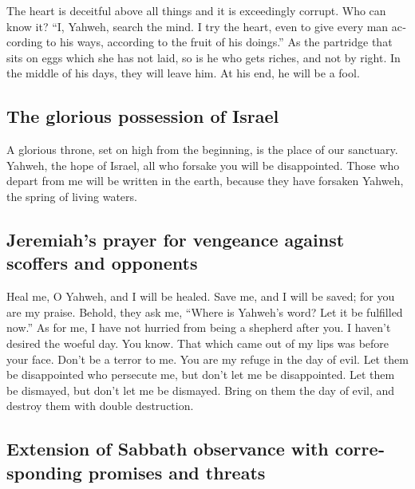 \begin{paracol}{2}
\begin{otherlanguage}{english}
 The heart is deceitful above all things and it is
exceedingly corrupt. Who can know it?  ``I, Yahweh,
search the mind. I try the heart, even to give every man according to
his ways, according to the fruit of his doings.''  As the
partridge that sits on eggs which she has not laid, so is he who gets
riches, and not by right. In the middle of his days, they will leave
him. At his end, he will be a fool.

\hypertarget{the-glorious-possession-of-israel}{%
\subsection{The glorious possession of
Israel}\label{the-glorious-possession-of-israel}}

 A glorious throne, set on high from the beginning, is
the place of our sanctuary.  Yahweh, the hope of Israel,
all who forsake you will be disappointed. Those who depart from me will
be written in the earth, because they have forsaken Yahweh, the spring
of living waters.

\hypertarget{jeremiahs-prayer-for-vengeance-against-scoffers-and-opponents}{%
\subsection{Jeremiah's prayer for vengeance against scoffers and
opponents}\label{jeremiahs-prayer-for-vengeance-against-scoffers-and-opponents}}

 Heal me, O Yahweh, and I will be healed. Save me, and I
will be saved; for you are my praise.  Behold, they ask
me, ``Where is Yahweh's word? Let it be fulfilled now.'' 
As for me, I have not hurried from being a shepherd after you. I haven't
desired the woeful day. You know. That which came out of my lips was
before your face.  Don't be a terror to me. You are my
refuge in the day of evil.  Let them be disappointed who
persecute me, but don't let me be disappointed. Let them be dismayed,
but don't let me be dismayed. Bring on them the day of evil, and destroy
them with double destruction.

\hypertarget{extension-of-sabbath-observance-with-corresponding-promises-and-threats}{%
\subsection{Extension of Sabbath observance with corresponding promises
and
threats}\label{extension-of-sabbath-observance-with-corresponding-promises-and-threats}}


\end{otherlanguage}
\end{paracol}
